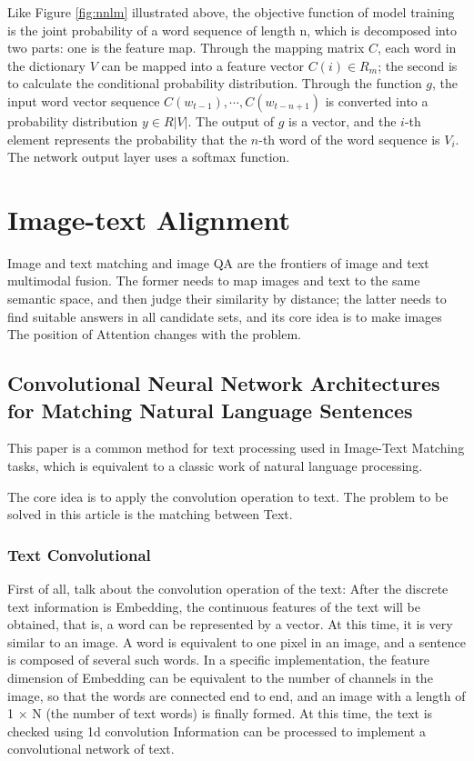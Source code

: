 Like Figure \ref{fig:nnlm} illustrated above, the objective function of model training is the joint probability of a word sequence of length n, which is decomposed into two parts: one is the feature map. Through the mapping matrix $C$, each word in the dictionary $V$ can be mapped into a feature vector $C(i)\in R_m$; the second is to calculate the conditional probability distribution. Through the function $g$, the input word vector sequence $C\left(w_{t-1}\right), \cdots, C\left(w_{t-n+1}\right)$ is converted into a probability distribution $y\in R|V|$. The output of $g$ is a vector, and the $i$-th element represents the probability that the $n$-th word of the word sequence is $V_i$. The network output layer uses a softmax function.

\subsubsection{}


\section{Image-text Alignment}
Image and text matching and image QA are the frontiers of image and text multimodal fusion. The former needs to map images and text to the same semantic space, and then judge their similarity by distance; the latter needs to find suitable answers in all candidate sets, and its core idea is to make images The position of Attention changes with the problem.

\subsection{Convolutional Neural Network Architectures for Matching Natural Language Sentences}

This paper \cite{hu2015convolutional} is a common method for text processing used in Image-Text Matching tasks, which is equivalent to a classic work of natural language processing.

The core idea is to apply the convolution operation to text. The problem to be solved in this article is the matching between Text.

\subsubsection{Text Convolutional}
First of all, talk about the convolution operation of the text: After the discrete text information is Embedding, the continuous features of the text will be obtained, that is, a word can be represented by a vector. At this time, it is very similar to an image. A word is equivalent to one pixel in an image, and a sentence is composed of several such words. In a specific implementation, the feature dimension of Embedding can be equivalent to the number of channels in the image, so that the words are connected end to end, and an image with a length of 1 × N (the number of text words) is finally formed. At this time, the text is checked using 1d convolution Information can be processed to implement a convolutional network of text.

